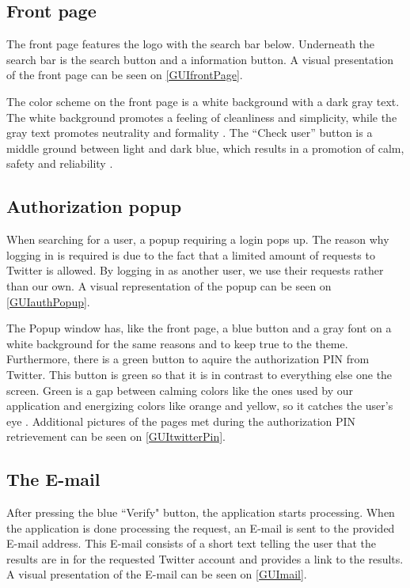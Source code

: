 \subsection{Front page}
The front page features the logo with the search bar below. Underneath the
search bar is the search button and a information button. A visual presentation
of the front page can be seen on \autoref{GUIfrontPage}.

{}

The color scheme on the front page is a white background with a dark gray text.
The white background promotes a feeling of cleanliness and simplicity, while the
gray text promotes neutrality and formality \citep[p. 63 \& 64]{WebUI}. 
The ``Check user'' button is a middle ground between light and dark blue, which
results in a promotion of calm, safety and reliability \citep[p. 61]{WebUI}.

\subsection{Authorization popup}

When searching for a user, a popup requiring a login pops up. The reason why
logging in is required is due to the fact that a limited amount of requests to
Twitter is allowed. By logging in as another user, we use their requests rather
than our own. A visual representation of the popup can be seen on
\autoref{GUIauthPopup}.


The Popup window has, like the front page, a blue button and a gray font on a
white background for the same reasons and to keep true to the theme.
Furthermore, there is a green button to aquire the authorization PIN from
Twitter. This button is green so that it is in contrast to everything else one
the screen. Green is a gap between calming colors like the ones used by our
application and energizing colors like orange and yellow, so it catches the
user's eye \citep[p. 60]{WebUI}. Additional pictures of the pages met during the
authorization PIN retrievement can be seen on \autoref{GUItwitterPin}.

\subsection{The E-mail}
After pressing the blue ``Verify" button, the application starts processing.
When the application is done processing the request, an E-mail is sent to the provided E-mail address. This E-mail consists of a short text telling the user
that the results are in for the requested Twitter account and provides a link to
the results.
A visual presentation of the E-mail can be seen on \autoref{GUImail}.

